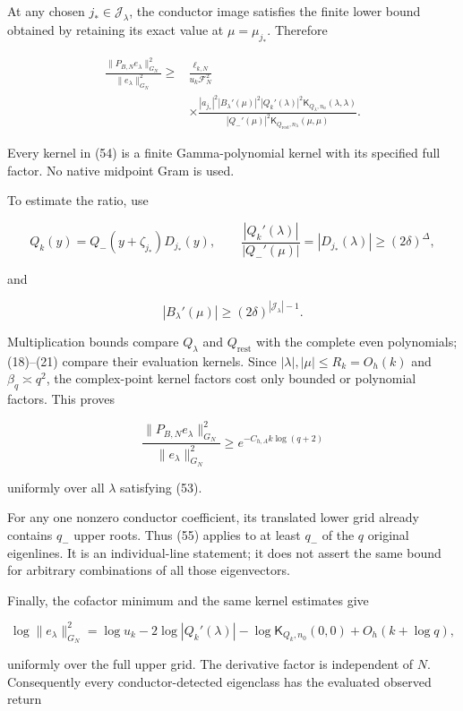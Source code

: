 \documentclass[11pt]{article}
\begin{document}
At any chosen \(j_*\in\mathcal J_\lambda\), the conductor image satisfies the finite lower bound obtained by retaining its exact value at \(\mu=\mu_{j_*}\). Therefore

\[
\boxed{
\begin{aligned}
\frac{\|P_{B,N}e_\lambda\|_{G_N}^2}
{\|e_\lambda\|_{G_N}^2}
\ge{}&
\frac{\ell_{k,N}}{u_k\mathcal F_N^2}\\
&\times
\frac{
|a_{j_*}|^2|B_\lambda'(\mu)|^2
|Q_k'(\lambda)|^2
\mathsf K_{Q_\lambda,n_a}(\lambda,\lambda)
}{
|Q_-'(\mu)|^2
\mathsf K_{Q_{\mathrm{rest}},n_\lambda}(\mu,\mu)
}.
\end{aligned}
}
\tag{54}
\]

Every kernel in (54) is a finite Gamma-polynomial kernel with its specified full factor. No native midpoint Gram is used.

To estimate the ratio, use

\[
Q_k(y)=Q_-(y+\zeta_{j_*})D_{j_*}(y),
\qquad
\frac{|Q_k'(\lambda)|}{|Q_-'(\mu)|}
=|D_{j_*}(\lambda)|
\ge(2\delta)^\Delta,
\]

and

\[
|B_\lambda'(\mu)|\ge(2\delta)^{|\mathcal J_\lambda|-1}.
\]

Multiplication bounds compare \(Q_\lambda\) and \(Q_{\mathrm{rest}}\) with the complete even polynomials; (18)--(21) compare their evaluation kernels. Since \(|\lambda|,|\mu|\le R_k=O_h(k)\) and \(\beta_q\asymp q^2\), the complex-point kernel factors cost only bounded or polynomial factors. This proves

\[
\boxed{
\frac{\|P_{B,N}e_\lambda\|_{G_N}^2}
{\|e_\lambda\|_{G_N}^2}
\ge e^{-C_{h,A}k\log(q+2)}
}
\tag{55}
\]

uniformly over all \(\lambda\) satisfying (53).

For any one nonzero conductor coefficient, its translated lower grid already contains \(q_-\) upper roots. Thus (55) applies to at least \(q_-\) of the \(q\) original eigenlines. It is an individual-line statement; it does not assert the same bound for arbitrary combinations of all those eigenvectors.

Finally, the cofactor minimum and the same kernel estimates give

\[
\log\|e_\lambda\|_{G_N}^2
=
\log u_k-2\log|Q_k'(\lambda)|
-\log\mathsf K_{Q_k,n_0}(0,0)
+O_h(k+\log q),
\]

uniformly over the full upper grid. The derivative factor is independent of \(N\). Consequently every conductor-detected eigenclass has the evaluated observed return
\end{document}
